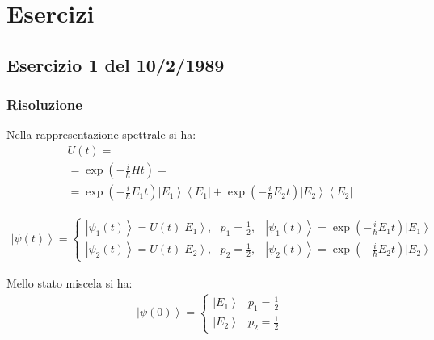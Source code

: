 \chapter{Esercizi} %
\section{Esercizio 1 del 10/2/1989} %

\subsection{Risoluzione} %



Nella rappresentazione spettrale si ha:
\begin{equation}\begin{split}
U\left(t\right)=\\
=\exp{\left(-\frac{i}{\hbar }Ht\right)}=\\
=\exp{\left(-\frac{i}{\hbar }E_1t\right)}\left |E_1 \right\rangle\left\langle E_1\right |+\exp{\left(-\frac{i}{\hbar }E_2t\right)}\left |E_2 \right\rangle\left\langle E_2\right |
\end{split}\end{equation}

\begin{equation}\begin{split}
\left |\psi \left(t\right) \right\rangle=\begin{cases}
\left |\psi _1\left(t\right) \right\rangle=U\left(t\right)\left |E_1 \right\rangle, \textrm{     } p_1=\frac{1}{2}, & \left |\psi _1\left(t\right) \right\rangle=\exp{\left(-\frac{i}{\hbar }E_1t\right)}\left |E_1 \right\rangle\\
\left |\psi _2\left(t\right) \right\rangle=U\left(t\right)\left |E_2 \right\rangle, \textrm{     } p_2=\frac{1}{2}, & \left |\psi _2\left(t\right) \right\rangle=\exp{\left(-\frac{i}{\hbar }E_2t\right)}\left |E_2 \right\rangle
\end{cases}
\end{split}\end{equation}


Mello stato miscela si ha:
\begin{equation}\begin{split}
\left |\psi \left(0\right) \right\rangle=\begin{cases}
\left |E_1 \right\rangle & p_1=\frac{1}{2}\\
\left |E_2 \right\rangle & p_2=\frac{1}{2}
\end{cases}
\end{split}\end{equation}

